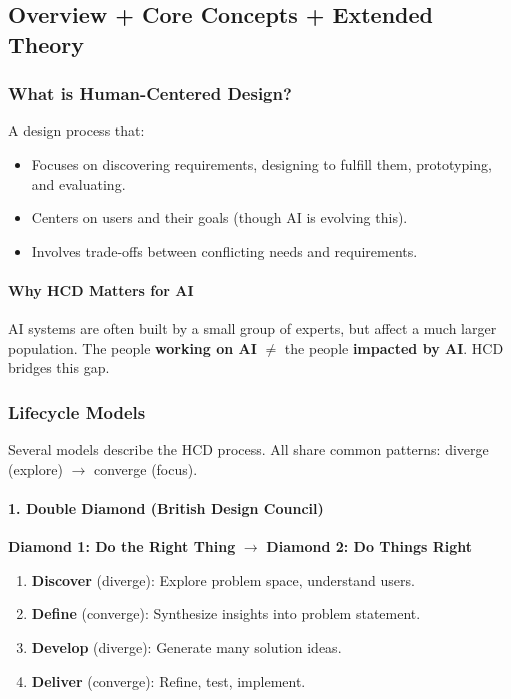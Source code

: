 \subsection{Overview + Core Concepts + Extended Theory}

\subsubsection*{What is Human-Centered Design?}

\begin{defbox}
A design process that:
\begin{itemize}
  \item Focuses on discovering requirements, designing to fulfill them, prototyping, and evaluating.
  \item Centers on users and their goals (though AI is evolving this).
  \item Involves trade-offs between conflicting needs and requirements.
\end{itemize}
\end{defbox}

\paragraph*{Why HCD Matters for AI}
AI systems are often built by a small group of experts, but affect a much larger population. The people \textbf{working on AI} $\neq$ the people \textbf{impacted by AI}. HCD bridges this gap.

\subsubsection*{Lifecycle Models}

Several models describe the HCD process. All share common patterns: diverge (explore) $\to$ converge (focus).

\paragraph*{1. Double Diamond (British Design Council)}

\begin{center}
\textbf{Diamond 1: Do the Right Thing} $\to$ \textbf{Diamond 2: Do Things Right}
\end{center}

\begin{enumerate}
  \item \textbf{Discover} (diverge): Explore problem space, understand users.
  \item \textbf{Define} (converge): Synthesize insights into problem statement.
  \item \textbf{Develop} (diverge): Generate many solution ideas.
  \item \textbf{Deliver} (converge): Refine, test, implement.
\end{enumerate}

